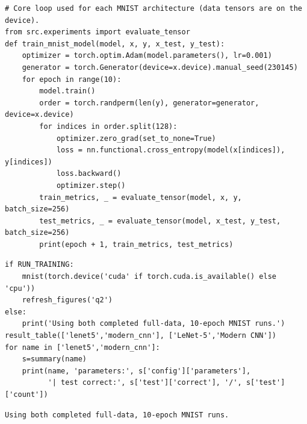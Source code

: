 \documentclass[10pt,a4paper]{article}
\begin{document}
\par\noindent\begin{minipage}{\linewidth}
\begin{lstlisting}
# Core loop used for each MNIST architecture (data tensors are on the device).
from src.experiments import evaluate_tensor
def train_mnist_model(model, x, y, x_test, y_test):
    optimizer = torch.optim.Adam(model.parameters(), lr=0.001)
    generator = torch.Generator(device=x.device).manual_seed(230145)
    for epoch in range(10):
        model.train()
        order = torch.randperm(len(y), generator=generator, device=x.device)
        for indices in order.split(128):
            optimizer.zero_grad(set_to_none=True)
            loss = nn.functional.cross_entropy(model(x[indices]), y[indices])
            loss.backward()
            optimizer.step()
        train_metrics, _ = evaluate_tensor(model, x, y, batch_size=256)
        test_metrics, _ = evaluate_tensor(model, x_test, y_test, batch_size=256)
        print(epoch + 1, train_metrics, test_metrics)
\end{lstlisting}
\end{minipage}\par

\par\noindent\begin{minipage}{\linewidth}
\begin{lstlisting}
if RUN_TRAINING:
    mnist(torch.device('cuda' if torch.cuda.is_available() else 'cpu'))
    refresh_figures('q2')
else:
    print('Using both completed full-data, 10-epoch MNIST runs.')
result_table(['lenet5','modern_cnn'], ['LeNet-5','Modern CNN'])
for name in ['lenet5','modern_cnn']:
    s=summary(name)
    print(name, 'parameters:', s['config']['parameters'],
          '| test correct:', s['test']['correct'], '/', s['test']['count'])
\end{lstlisting}
\end{minipage}\par

\par\noindent\begin{minipage}{\linewidth}
\begin{lstlisting}[language={}]
Using both completed full-data, 10-epoch MNIST runs.
\end{lstlisting}
\end{minipage}\par
\end{document}
